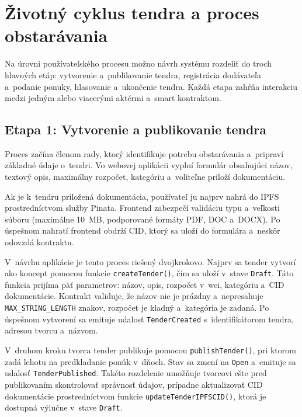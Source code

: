 \section{Životný cyklus tendra a proces obstarávania}
\label{sec:tender_lifecycle}

Na úrovni používateľského procesu možno návrh systému rozdeliť do troch
hlavných etáp: vytvorenie a~publikovanie tendra, registrácia dodávateľa
a~podanie ponuky, hlasovanie a~ukončenie tendra. Každá etapa zahŕňa
interakciu medzi jedným alebo viacerými aktérmi a~smart kontraktom.

\subsection{Etapa 1: Vytvorenie a publikovanie tendra}
\label{subsec:lifecycle_creation}

Proces začína členom rady, ktorý identifikuje potrebu obstarávania
a~pripraví základné údaje o~tendri. Vo webovej aplikácii vyplní formulár
obsahujúci názov, textový opis, maximálny rozpočet, kategóriu
a~voliteľne priloží dokumentáciu.

Ak je k~tendru priložená dokumentácia, používateľ ju najprv nahrá do IPFS
prostredníctvom služby Pinata. Frontend zabezpečí validáciu typu a~veľkosti
súboru (maximálne 10~MB, podporované formáty PDF, DOC a~DOCX). Po úspešnom
nahratí frontend obdrží CID, ktorý sa uloží do formulára a~neskôr odovzdá
kontraktu.

V~návrhu aplikácie je tento proces riešený dvojkrokovo. Najprv sa tender
vytvorí ako koncept pomocou funkcie \texttt{createTender()}, čím sa uloží
v~stave \texttt{Draft}. Táto funkcia prijíma päť parametrov: názov, opis,
rozpočet v~wei, kategóriu a~CID dokumentácie. Kontrakt validuje, že názov
nie je prázdny a~nepresahuje \texttt{MAX\_STRING\_LENGTH} znakov, rozpočet
je kladný a~kategória je zadaná. Po úspešnom vytvorení sa emituje udalosť
\texttt{TenderCreated} s~identifikátorom tendra, adresou tvorcu a~názvom.

V~druhom kroku tvorca tender publikuje pomocou \texttt{publishTender()},
pri ktorom zadá lehotu na predkladanie ponúk v~dňoch. Stav sa zmení na
\texttt{Open} a~emituje sa udalosť \texttt{TenderPublished}. Takéto
rozdelenie umožňuje tvorcovi ešte pred publikovaním skontrolovať správnosť
údajov, prípadne aktualizovať CID dokumentácie prostredníctvom funkcie
\texttt{updateTenderIPFSCID()}, ktorá je dostupná výlučne v~stave
\texttt{Draft}.

